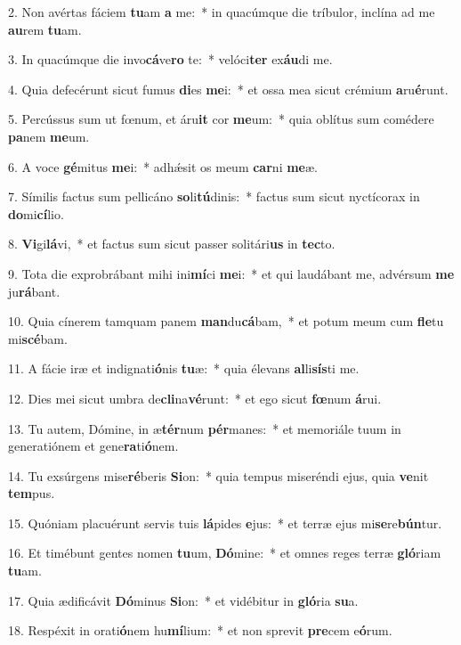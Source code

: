 2. Non avértas fáciem \textbf{tu}am \textbf{a} me:~*  in quacúmque die tríbulor, inclína ad me \textbf{au}rem \textbf{tu}am.\

3. In quacúmque die invo\textbf{cá}ve\textbf{ro} te:~*  velóci\textbf{ter} ex\textbf{áu}di me.\

4. Quia defecérunt sicut fumus \textbf{di}es \textbf{me}i:~*  et ossa mea sicut crémium \textbf{a}ru\textbf{é}runt.\

5. Percússus sum ut fœnum, et áru\textbf{it} cor \textbf{me}um:~*  quia oblítus sum comédere \textbf{pa}nem \textbf{me}um.\

6. A voce \textbf{gé}mitus \textbf{me}i:~*  adhǽsit os meum \textbf{car}ni \textbf{me}æ.\

7. Símilis factus sum pellicáno \textbf{so}li\textbf{tú}dinis:~*  factus sum sicut nyctícorax in \textbf{do}mi\textbf{cí}lio.\

8. \textbf{Vi}gi\textbf{lá}vi,~*  et factus sum sicut passer solitári\textbf{us} in \textbf{tec}to.\

9. Tota die exprobrábant mihi ini\textbf{mí}ci \textbf{me}i:~*  et qui laudábant me, advérsum \textbf{me} ju\textbf{rá}bant.\

10. Quia cínerem tamquam panem \textbf{man}du\textbf{cá}bam,~*  et potum meum cum \textbf{fle}tu mi\textbf{scé}bam.\

11. A fácie iræ et indignati\textbf{ó}nis \textbf{tu}æ:~*  quia élevans \textbf{al}li\textbf{sís}ti me.\

12. Dies mei sicut umbra de\textbf{cli}na\textbf{vé}runt:~*  et ego sicut \textbf{fœ}num \textbf{á}rui.\

13. Tu autem, Dómine, in æ\textbf{tér}num \textbf{pér}manes:~*  et memoriále tuum in generatiónem et gene\textbf{ra}ti\textbf{ó}nem.\

14. Tu exsúrgens mise\textbf{ré}beris \textbf{Si}on:~*  quia tempus miseréndi ejus, quia \textbf{ve}nit \textbf{tem}pus.\

15. Quóniam placuérunt servis tuis \textbf{lá}pides \textbf{e}jus:~*  et terræ ejus mi\textbf{se}re\textbf{bún}tur.\

16. Et timébunt gentes nomen \textbf{tu}um, \textbf{Dó}mine:~*  et omnes reges terræ \textbf{gló}riam \textbf{tu}am.\

17. Quia ædificávit \textbf{Dó}minus \textbf{Si}on:~*  et vidébitur in \textbf{gló}ria \textbf{su}a.\

18. Respéxit in orati\textbf{ó}nem hu\textbf{mí}lium:~*  et non sprevit \textbf{pre}cem e\textbf{ó}rum.\

